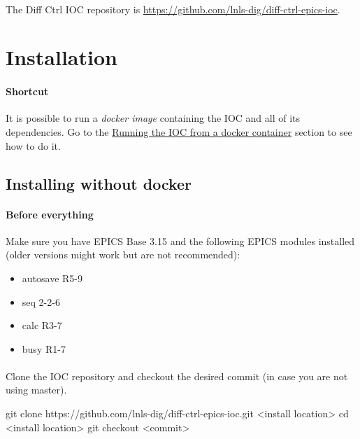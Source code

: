 \documentclass[openany]{article}
\begin{document}
\paragraph{} The Diff Ctrl IOC repository is \url{https://github.com/lnls-dig/diff-ctrl-epics-ioc}.

\section{Installation}

    \paragraph{Shortcut} It is possible to run a \emph{docker image} containing the IOC and all of its dependencies. Go to the \hyperref[sec:run-with-docker]{Running the IOC from a docker container} section to see how to do it.

    \subsection{Installing without docker}

        \paragraph{Before everything} Make sure you have EPICS Base 3.15 and the following EPICS modules installed (older versions might work but are not recommended):

        \begin{itemize}
          \item autosave R5-9
          \item seq 2-2-6
          \item calc R3-7
          \item busy R1-7
        \end{itemize} 

        \paragraph{} Clone the IOC repository and checkout the desired commit (in case you are not using master).

            \vspace{1mm}
            \begin{code}
git clone https://github.com/lnls-dig/diff-ctrl-epics-ioc.git <install location>
cd <install location>
git checkout <commit>
            \end{code}
            \vspace{1mm}
\end{document}
